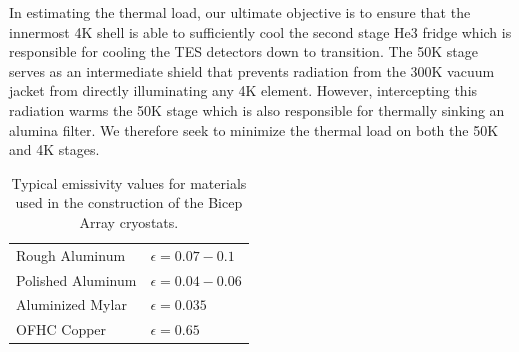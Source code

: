 \documentclass[12pt]{article}
\begin{document}
In
estimating the thermal load, our ultimate objective is to ensure that the
innermost 4K shell is able to sufficiently cool the second stage He3 fridge
which is responsible for cooling the TES detectors down to transition. The 50K
stage serves as an intermediate shield that prevents radiation from the 300K
vacuum jacket from directly illuminating any 4K element. However, intercepting
this radiation warms the 50K stage which is also responsible for thermally
sinking an alumina filter. We therefore seek to minimize the thermal load on
both the 50K and 4K stages. 








\begin{table}
	\center
\begin{tabular}{|l|l|}
	\hline
	Rough Aluminum & $\epsilon = 0.07-0.1$ \\
	Polished Aluminum & $\epsilon = 0.04 - 0.06$ \\
	Aluminized Mylar & $\epsilon = 0.035$ \\
	OFHC Copper & $\epsilon = 0.65$ \\ \hline
\end{tabular}
	\caption{Typical emissivity values for materials used in the construction
	of the Bicep Array cryostats.}
	\label{table:emis}
\end{table}






\printbibliography
\end{document}
